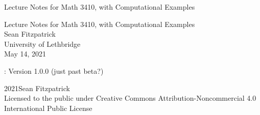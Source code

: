 \documentclass[oneside,10pt,]{book}
\newcommand{\titlepagefont}{\relax}
\numberwithin{equation}{section}
\begin{document}
\frontmatter
\thispagestyle{empty}
{\titlepagefont\centering
\vspace*{0.28\textheight}
{\Huge Lecture Notes for Math 3410, with Computational Examples}\\}
\clearpage
\thispagestyle{empty}
{\titlepagefont\centering
\vspace*{0.14\textheight}
{\Huge Lecture Notes for Math 3410, with Computational Examples}\\[3\baselineskip]
{\Large Sean Fitzpatrick}\\[0.5\baselineskip]
{\Large University of Lethbridge}\\[3\baselineskip]
{\Large May 14, 2021}\\}
\clearpage
\thispagestyle{empty}
\label{g:colophon:idm45936167211696}{}\hypertarget{g:colophon:idm45936167211696}{}
: Version 1.0.0 (just past beta?)\par\medskip
\noindent\textcopyright{}2021\quad{}Sean Fitzpatrick\\[0.5\baselineskip]
Licensed to the public under Creative Commons Attribution-Noncommercial 4.0 International Public License\par\medskip
{}
\null\clearpage
%
%
\typeout{************************************************}
\typeout{************************************************}
%
\end{document}
